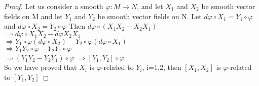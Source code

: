  \begin{proof}
  Let us consider a smooth $\varphi:M \rightarrow N$, and let $X_1$ and $X_2$ be smooth vector fields on M and let 
  $Y_1$ and $Y_2$ be smooth vector fields on N.
 Let $d\varphi \circ X_1 = Y_1 \circ \varphi$ and 
 $d \varphi \circ X_2 = Y_2 \circ \varphi$
 Then $d\varphi \circ (X_1 X_2 - X_2 X_1)$
 \\ $\Rightarrow d\varphi \circ X_1 X_2 - d\varphi X_2 X_1$
 \\ $\Rightarrow Y_1 \circ \varphi(d\varphi \circ X_2) - Y_2 \circ \varphi(d\varphi \circ X_1)$
 \\ $\Rightarrow Y_1Y_2 \circ \varphi - Y_2 Y_1 \circ \varphi$
 \\ $\Rightarrow (Y_1Y_2 - Y_2Y_1) \circ \varphi$
 $\Rightarrow [Y_1, Y_2] \circ \varphi$\\
 So we have proved that $X_{i}$ is $\varphi$-related to $Y_i$, i=1,2, then $[X_1,X_2]$ is $\varphi$-related to $[Y_1,Y_2]$ 
 \end{proof}

